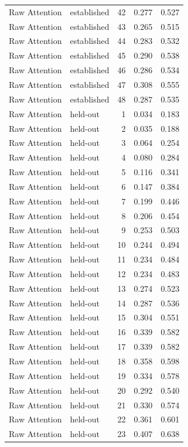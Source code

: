 \begin{tabular}{llrrr}
Raw Attention & established & 42 & 0.277 & 0.527 \\
Raw Attention & established & 43 & 0.265 & 0.515 \\
Raw Attention & established & 44 & 0.283 & 0.532 \\
Raw Attention & established & 45 & 0.290 & 0.538 \\
Raw Attention & established & 46 & 0.286 & 0.534 \\
Raw Attention & established & 47 & 0.308 & 0.555 \\
Raw Attention & established & 48 & 0.287 & 0.535 \\
Raw Attention & held-out & 1 & 0.034 & 0.183 \\
Raw Attention & held-out & 2 & 0.035 & 0.188 \\
Raw Attention & held-out & 3 & 0.064 & 0.254 \\
Raw Attention & held-out & 4 & 0.080 & 0.284 \\
Raw Attention & held-out & 5 & 0.116 & 0.341 \\
Raw Attention & held-out & 6 & 0.147 & 0.384 \\
Raw Attention & held-out & 7 & 0.199 & 0.446 \\
Raw Attention & held-out & 8 & 0.206 & 0.454 \\
Raw Attention & held-out & 9 & 0.253 & 0.503 \\
Raw Attention & held-out & 10 & 0.244 & 0.494 \\
Raw Attention & held-out & 11 & 0.234 & 0.484 \\
Raw Attention & held-out & 12 & 0.234 & 0.483 \\
Raw Attention & held-out & 13 & 0.274 & 0.523 \\
Raw Attention & held-out & 14 & 0.287 & 0.536 \\
Raw Attention & held-out & 15 & 0.304 & 0.551 \\
Raw Attention & held-out & 16 & 0.339 & 0.582 \\
Raw Attention & held-out & 17 & 0.339 & 0.582 \\
Raw Attention & held-out & 18 & 0.358 & 0.598 \\
Raw Attention & held-out & 19 & 0.334 & 0.578 \\
Raw Attention & held-out & 20 & 0.292 & 0.540 \\
Raw Attention & held-out & 21 & 0.330 & 0.574 \\
Raw Attention & held-out & 22 & 0.361 & 0.601 \\
Raw Attention & held-out & 23 & 0.407 & 0.638 \\

\end{tabular}
